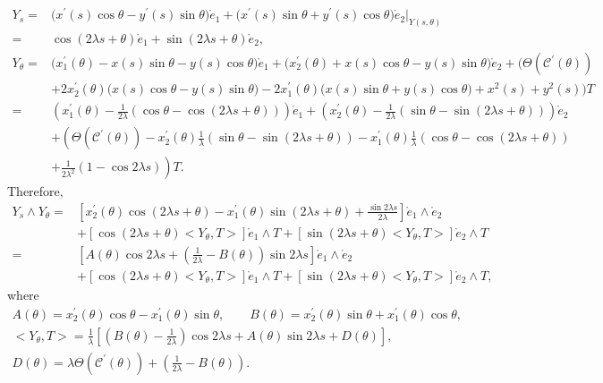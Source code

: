 \documentclass[10pt,a4paper]{amsart}
\numberwithin{equation}{section}
\begin{document}
\begin{align*} %
Y_{s}={}&\bigl(x^{\prime }(s)\cos \theta-y^{\prime }(s)\sin \theta \bigr)
\mathring e_1+\bigl(x^{\prime }(s)\sin \theta+y^{\prime }(s)\cos \theta \bigr)
\mathring e_2|_{Y(s,\theta)} \\
={}&\cos{(2\lambda s+\theta)}\mathring e_1+\sin{(2\lambda s+\theta)}\mathring
e_2, \\
Y_{\theta}={}&\bigl(x^{\prime }_{1}(\theta)-x(s)\sin \theta-y(s)\cos \theta
\bigr)\mathring e_1+\bigl(x^{\prime }_{2}(\theta)+x(s)\cos \theta-y(s)\sin
\theta \bigr)\mathring e_2 +\bigl(\Theta(\mathcal{C}^{\prime }(\theta))\\
&+2x^{\prime }_{2}(\theta)
\bigl(x(s)\cos \theta-y(s)\sin \theta \bigr)-2x^{\prime }_{1}(\theta)\bigl(
x(s)\sin \theta+y(s)\cos{\theta}\bigr)
+x^2(s)+y^2(s)\bigr)T \\
={}&\left(x^{\prime }_{1}(\theta)-\frac{1}{2\lambda}(\cos{\theta}-\cos{
(2\lambda s+\theta)})\right)\mathring e_1+\left(x^{\prime }_{2}(\theta)-\frac{1
}{2\lambda}(\sin{\theta}-\sin{(2\lambda s+\theta)})\right)\mathring e_2 \\
& +\left(\Theta(\mathcal{C}^{\prime }(\theta))-x^{\prime }_{2}(\theta)
\frac{1}{\lambda}(\sin{\theta}-\sin{(2\lambda s+\theta)})-x^{\prime
}_{1}(\theta)\frac{1}{\lambda}(\cos{\theta}-\cos{(2\lambda s+\theta)}) \right.\\
&\left. +\frac{1}{2\lambda^2}(1-\cos{2\lambda s})\right)T.
\end{align*}
Therefore,
\begin{align}
Y_{s}\wedge Y_{\theta}={}&\left[x^{\prime }_{2}(\theta)\cos{(2\lambda
s+\theta)}-x^{\prime }_{1}(\theta)\sin{(2\lambda s+\theta)}+\frac{\sin{
2\lambda s}}{2\lambda}\right]\mathring e_{1}\wedge \mathring e_{2} \nonumber\\
& +[\cos{(2\lambda s+\theta)}\big<Y_{\theta},T\big>]\mathring
e_{1}\wedge T+[\sin{(2\lambda s+\theta)}\big<Y_{\theta},T\big>]\mathring
e_{2}\wedge T \nonumber\\
={}&\left[A(\theta)\cos{2\lambda s}+\left(\frac{1}{2\lambda}
-B(\theta)\right)\sin{2\lambda s}\right]\mathring e_{1}\wedge \mathring e_{2}\nonumber
\\
&+[\cos{(2\lambda s+\theta)}\big<Y_{\theta},T\big>]\mathring
e_{1}\wedge T+[\sin{(2\lambda s+\theta)}\big<Y_{\theta},T\big>]\mathring
e_{2}\wedge T,\label{cofra1}
\end{align}
where
\begin{gather}
A(\theta)=x^{\prime }_{2}(\theta)\cos{\theta}-x^{\prime }_{1}(\theta)\sin{
\theta},\qquad
B(\theta)=x^{\prime }_{2}(\theta)\sin{\theta}+x^{\prime }_{1}(\theta)\cos{
\theta}, \nonumber\\
\big<Y_{\theta},T\big>=\frac{1}{\lambda}\left[\left(B(\theta)-\frac{1}{
2\lambda}\right)\cos{2\lambda s}+A(\theta)\sin{2\lambda s}+D(\theta)\right],\nonumber
\\
D(\theta)=\lambda \Theta(\mathcal{C}^{\prime }(\theta))+\left(\frac{1}{
2\lambda}-B(\theta)\right). \label{cofra2}
\end{gather}
\end{document}

